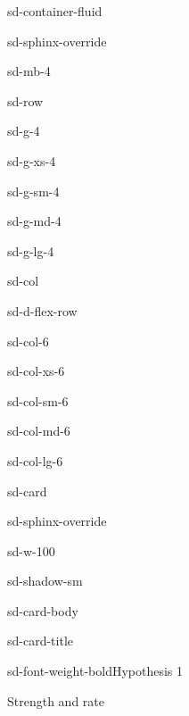\documentclass[letterpaper,10pt,english]{jupyterBook}
\let\sphinxpxdimen\pdfpxdimen\else\newdimen\sphinxpxdimen
\begin{document}
\begin{sphinxuseclass}{sd-container-fluid}
\begin{sphinxuseclass}{sd-sphinx-override}
\begin{sphinxuseclass}{sd-mb-4}
\begin{sphinxuseclass}{sd-row}
\begin{sphinxuseclass}{sd-g-4}
\begin{sphinxuseclass}{sd-g-xs-4}
\begin{sphinxuseclass}{sd-g-sm-4}
\begin{sphinxuseclass}{sd-g-md-4}
\begin{sphinxuseclass}{sd-g-lg-4}
\begin{sphinxuseclass}{sd-col}
\begin{sphinxuseclass}{sd-d-flex-row}
\begin{sphinxuseclass}{sd-col-6}
\begin{sphinxuseclass}{sd-col-xs-6}
\begin{sphinxuseclass}{sd-col-sm-6}
\begin{sphinxuseclass}{sd-col-md-6}
\begin{sphinxuseclass}{sd-col-lg-6}
\begin{sphinxuseclass}{sd-card}
\begin{sphinxuseclass}{sd-sphinx-override}
\begin{sphinxuseclass}{sd-w-100}
\begin{sphinxuseclass}{sd-shadow-sm}
\begin{sphinxuseclass}{sd-card-body}
\begin{sphinxuseclass}{sd-card-title}
\begin{sphinxuseclass}{sd-font-weight-bold}Hypothesis 1
\end{sphinxuseclass}
\end{sphinxuseclass}
\sphinxAtStartPar
Strength and rate

\noindent{\hspace*{\fill}\sphinxincludegraphics[width=200\sphinxpxdimen]{{england-mckenzie}.png}\hspace*{\fill}}

\sphinxAtStartPar
{}


\end{sphinxuseclass}
\end{sphinxuseclass}
\end{sphinxuseclass}
\end{sphinxuseclass}
\end{sphinxuseclass}
\end{sphinxuseclass}
\end{sphinxuseclass}
\end{sphinxuseclass}
\end{sphinxuseclass}
\end{sphinxuseclass}
\end{sphinxuseclass}
\end{sphinxuseclass}
\end{sphinxuseclass}
\end{sphinxuseclass}
\end{sphinxuseclass}
\end{sphinxuseclass}
\end{sphinxuseclass}
\end{sphinxuseclass}
\end{sphinxuseclass}
\end{sphinxuseclass}
\end{sphinxuseclass}
\end{document}
